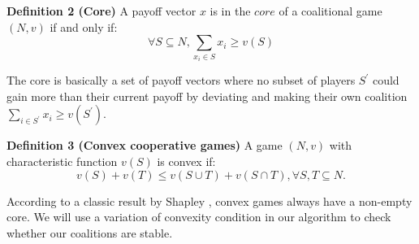 
            {\bf Definition 2 (Core)} A payoff vector $x$ is in the $core$ of
            a coalitional game $(N, v)$ if and only if:
            \begin{equation}\label{eq:core}
            \forall S \subseteq N, \sum_{x_i \in S} x_i \geq v(S)
            \end{equation}

            The core is basically a set of payoff vectors where no subset of
            players $S^\prime$ could gain more than their current payoff by
            deviating and making their own coalition $\sum_{i \in S^\prime}
            x_i \geq v(S^\prime)$.

            {\bf Definition 3 (Convex cooperative games)} A game $(N,v)$ with
            characteristic function $v(S)$ is convex if:
            \begin{equation}\label{eq:convex}
            v(S) + v(T) \leq v(S \cup T) + v (S \cap T), \forall S,T \subseteq
            N.
            \end{equation}

            According to a classic result by Shapley \cite{S1971cores}, convex
            games always have a non-empty core. We will use a variation of
            convexity condition in our algorithm to check whether our
            coalitions are stable.

%

